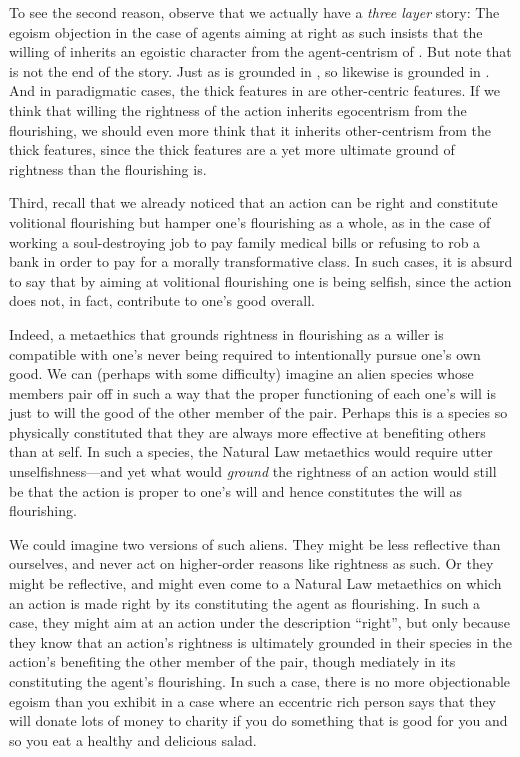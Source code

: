 To see the second reason, observe that we actually have a \textit{three layer} story:
The egoism objection in the case of agents aiming at right as such insists that the willing of  inherits 
an egoistic character from the agent-centrism of . But note that  is not the end of the story. Just as 
 is grounded in 
, so likewise  is grounded in . And in paradigmatic cases, the thick features in  
are other-centric features. If we think that willing the rightness of the action inherits egocentrism from the flourishing, we should even more 
think that it inherits  other-centrism from the thick features, since the thick features are a yet more ultimate ground of rightness
than the flourishing is.

Third, recall that we already noticed that an action can be right and constitute volitional flourishing but hamper one's flourishing as 
a whole, as in the case of working a soul-destroying job to pay family medical bills or refusing to rob a bank in order to pay for a 
morally transformative class. In such cases, it is absurd to say that by aiming at volitional flourishing one is being selfish, since the
action does not, in fact, contribute to one's good overall.

Indeed, a metaethics that grounds rightness in flourishing as a willer is compatible with one's never being required to intentionally pursue one's own good.
We can (perhaps with some difficulty) imagine an alien species whose members pair off in such a way that the proper functioning of
each one's will is just to will the good of the other member of the pair. Perhaps this is a species so physically constituted that
they are always more effective at benefiting others than at self. In such a species, the Natural Law metaethics would require 
utter unselfishness---and yet what would \textit{ground} the rightness of an action would still be that the action is proper to one's
will and hence constitutes the will as flourishing. 

We could imagine two versions of such aliens. They might be less reflective
than ourselves, and never act on higher-order reasons like rightness as such. Or they might be reflective, and might even come to
a Natural Law metaethics on which an action is made right by its constituting the agent as flourishing. In such a case, they might
aim at an action under the description ``right'', but only because they know that an action's rightness is ultimately grounded in their 
species in the action's benefiting the other member of the pair, though mediately in its constituting the agent's flourishing. 
In such a case, there is no more objectionable egoism than you exhibit in a case where an eccentric rich person says that they
will donate lots of money to charity if you do something that is good for you and so you eat a healthy and delicious salad. 

